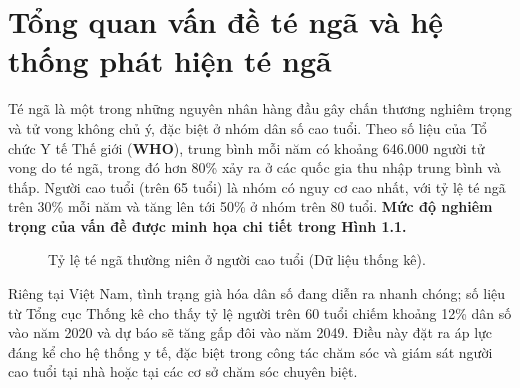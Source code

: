 \section{Tổng quan vấn đề té ngã và hệ thống phát hiện té ngã}

Té ngã là một trong những nguyên nhân hàng đầu gây chấn thương nghiêm trọng và tử vong không chủ ý, đặc biệt ở nhóm dân số cao tuổi. Theo số liệu của Tổ chức Y tế Thế giới (\textbf{WHO}), trung bình mỗi năm có khoảng 646.000 người tử vong do té ngã, trong đó hơn 80\% xảy ra ở các quốc gia thu nhập trung bình và thấp. Người cao tuổi (trên 65 tuổi) là nhóm có nguy cơ cao nhất, với tỷ lệ té ngã trên 30\% mỗi năm và tăng lên tới 50\% ở nhóm trên 80 tuổi. \textbf{Mức độ nghiêm trọng của vấn đề được minh họa chi tiết trong Hình 1.1.}

\begin{figure}[h]
    \centering
    \caption{Tỷ lệ té ngã thường niên ở người cao tuổi (Dữ liệu thống kê).}
    \label{fig:ti_le_nga}
\end{figure}
Riêng tại Việt Nam, tình trạng già hóa dân số đang diễn ra nhanh chóng; số liệu từ Tổng cục Thống kê cho thấy tỷ lệ người trên 60 tuổi chiếm khoảng 12\% dân số vào năm 2020 và dự báo sẽ tăng gấp đôi vào năm 2049. Điều này đặt ra áp lực đáng kể cho hệ thống y tế, đặc biệt trong công tác chăm sóc và giám sát người cao tuổi tại nhà hoặc tại các cơ sở chăm sóc chuyên biệt.

